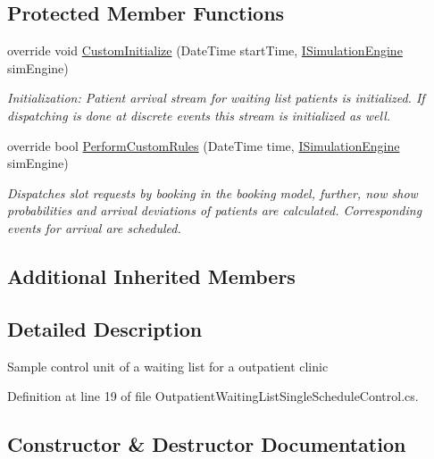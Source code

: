\subsection*{Protected Member Functions}
\begin{DoxyCompactItemize}
\item 
override void \hyperlink{class_sample_hospital_model_1_1_outpatient_1_1_outpatient_waiting_list_single_schedule_control_a6a0e24f518e6c6137097894c16d85432}{Custom\+Initialize} (Date\+Time start\+Time, \hyperlink{interface_simulation_core_1_1_simulation_classes_1_1_i_simulation_engine}{I\+Simulation\+Engine} sim\+Engine)
\begin{DoxyCompactList}\small\item\em Initialization\+: Patient arrival stream for waiting list patients is initialized. If dispatching is done at discrete events this stream is initialized as well. \end{DoxyCompactList}\item 
override bool \hyperlink{class_sample_hospital_model_1_1_outpatient_1_1_outpatient_waiting_list_single_schedule_control_a74b5acd572a19365982b2a6da3a65de3}{Perform\+Custom\+Rules} (Date\+Time time, \hyperlink{interface_simulation_core_1_1_simulation_classes_1_1_i_simulation_engine}{I\+Simulation\+Engine} sim\+Engine)
\begin{DoxyCompactList}\small\item\em Dispatches slot requests by booking in the booking model, further, now show probabilities and arrival deviations of patients are calculated. Corresponding events for arrival are scheduled. \end{DoxyCompactList}\end{DoxyCompactItemize}
\subsection*{Additional Inherited Members}


\subsection{Detailed Description}
Sample control unit of a waiting list for a outpatient clinic 



Definition at line 19 of file Outpatient\+Waiting\+List\+Single\+Schedule\+Control.\+cs.



\subsection{Constructor \& Destructor Documentation}
